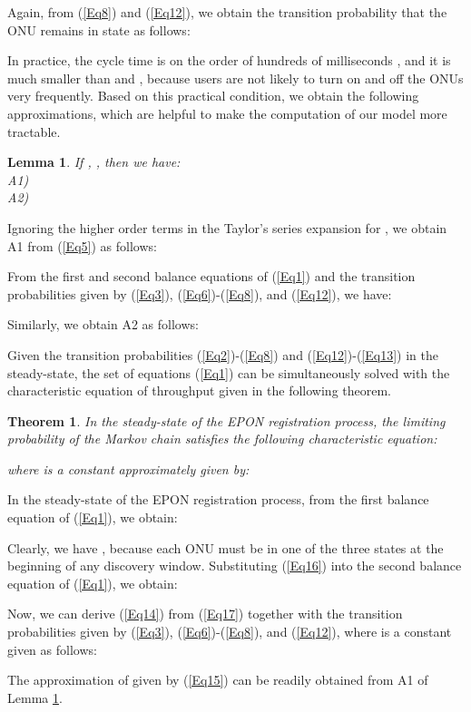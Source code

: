 \documentclass[journal]{IEEEtran}
\newtheorem{lemma}{\textbf{Lemma}}
\newtheorem{theorem}{\textbf{Theorem}}
\begin{document}
Again, from (\ref{Eq8}) and (\ref{Eq12}), we obtain the transition probability  that the ONU remains in state  as follows:


In practice, the cycle time  is on the order of hundreds of milliseconds \cite{1kramer2005,17Hajduczenia}, and it is much smaller than  and , because users are not likely to turn on and off the ONUs very frequently. Based on this practical condition, we obtain the following approximations, which are helpful to make the computation of our model more tractable.
\begin{lemma} \label{lemma2}
  If , , then we have:\\
A1) \\
A2) 
\end{lemma}
\begin{IEEEproof}
  Ignoring the higher order terms in the Taylor's series expansion  for , we obtain A1 from (\ref{Eq5}) as follows:

From the first and second balance equations of (\ref{Eq1}) and the transition probabilities given by (\ref{Eq3}), (\ref{Eq6})-(\ref{Eq8}), and (\ref{Eq12}), we have:

Similarly, we obtain A2 as follows:

\end{IEEEproof}

Given the transition probabilities (\ref{Eq2})-(\ref{Eq8}) and (\ref{Eq12})-(\ref{Eq13}) in the steady-state, the set of equations (\ref{Eq1}) can be simultaneously solved with the characteristic equation of throughput given in the following theorem.
\begin{theorem}\label{theorem1}
  In the steady-state of the EPON registration process, the limiting probability  of the Markov chain satisfies the following characteristic equation:

where  is a constant approximately given by:

\end{theorem}
\begin{IEEEproof}
  In the steady-state of the EPON registration process, from the first balance equation of (\ref{Eq1}), we obtain:

Clearly, we have , because each ONU must be in one of the three states at the beginning of any discovery window. Substituting (\ref{Eq16}) into the second balance equation of (\ref{Eq1}), we obtain:

Now, we can derive (\ref{Eq14}) from (\ref{Eq17}) together with the transition probabilities given by (\ref{Eq3}), (\ref{Eq6})-(\ref{Eq8}), and (\ref{Eq12}), where  is a constant given as follows:

The approximation of  given by (\ref{Eq15}) can be readily obtained from A1 of Lemma \ref{lemma2}.
\end{IEEEproof}
\end{document}
